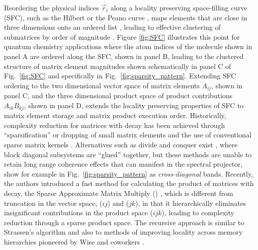 Reordering the physical indices $\vec{r}_{i}$ along a locality preserving
space-filling curve (SFC), such as the Hilbert \cite{HilberCurve} or the Peano
curve \cite{peano1890courbe}, maps elements that are close in three dimensions
onto an ordered list \cite{Warren:1992:HOT, Warren:1995:HOTb,
Samet:2006:DBDS}, leading to effective clustering of submatrices by order of
magnitude \cite{Challacombe:2000:SpMM}.  Figure \ref{fig:SFC} illustrates this
point for quantum chemistry applications where the atom indices of the
molecule shown in panel A are ordered along the SFC, shown in panel B, leading
to the clustered structure of matrix element magnitudes shown schematically in
panel C of Fig.~\ref{fig:SFC} and specifically in
Fig.~\ref{fig:sparsity_pattern}.  Extending SFC ordering to the two
dimensional vector space of matrix elements $A_{ij}$, shown in panel C, and
the three dimensional product space of product contributions $A_{ik} B_{kj}$,
shown in panel D, extends the locality preserving properties of SFC to matrix
element storage and matrix product execution order. Historically, complexity
reduction for matrices with decay has been achieved through ``sparsification''
or dropping of small matrix elements and the use of conventional sparse matrix
kernels \cite{Galli:1996:ONREV, Goedecker98, Goedecker:1999:ONREV,
0953-8984-14-11-303, Goedecker:2003:ONREV, Li:2005:ONREV, bowler2011:ONREV}.
Alternatives such as divide and conquer exist \cite{yang1991direct,
yang1995density, lee1998linear, Nakano2007642}, where block diagonal
subsystems are ``glued'' together, but these methods are unable to retain long
range coherence effects that can manifest in the spectral projector, show for
example in Fig.~\ref{fig:sparsity_pattern} as \emph{cross-diagonal} bands.
Recently, the authors introduced a fast method for calculating the product of
matrices with decay, the Sparse Approximate Matrix Multiply (\SpAMM{})
\cite{ChallacombeBock2010}, which is different from truncation in the vector
space, ($ij$) and ($jk$), in that it hierarchically eliminates insignificant
contributions in the product space ($ijk$), leading to complexity reduction
through a sparse product space.  The recursive approach is similar to
Strassen's algorithm \cite{springerlink:10.1007/BF02165411} and also to
methods of improving locality across memory hierarchies pioneered by Wise and
coworkers \cite{Frens:1997:AMT:263767.263789, Wise:2001:LSM:568014.379559,
Lorton:2006:ABL:1166133.1166134, Wise1990282,
springerlink:10.1007/3-540-51084-2_9, Wise:1984:RMQ:1089389.1089398,
Wise:Ahnentafel}.

